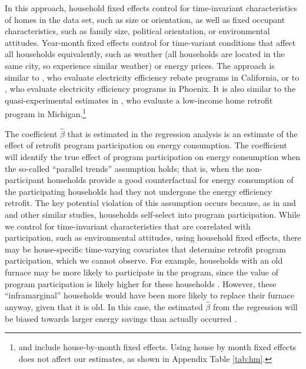 \documentclass{article}
\begin{document}
In this approach, household fixed effects control for time-invariant characteristics of homes in the data set, such as size or orientation, as well as fixed occupant characteristics, such as family size, political orientation, or environmental attitudes. Year-month fixed effects control for time-variant conditions that affect all households equivalently, such as weather (all households are located in the same city, so experience similar weather) or energy prices. The approach is similar to \cite{chuang2022residential}, who evaluate electricity efficiency rebate programs in California, or to \cite{liang2018energy}, who evaluate electricity efficiency programs in Phoenix. It is also similar to the quasi-experimental estimates in \cite{fowlie2018energy}, who evaluate a low-income home retrofit program in Michigan.\footnote{\cite{chuang2022residential} and \cite{fowlie2018energy} include house-by-month fixed effects. Using house by month fixed effects does not affect our estimates, as shown in Appendix Table \ref{tab:hm}.}

The coefficient $\hat{\beta}$ that is estimated in the regression analysis is an estimate of the effect of retrofit program participation on energy consumption. The coefficient will identify the true effect of program participation on energy consumption when the so-called ``parallel trends'' assumption holds; that is, when the non-participant households provide a good counterfactual for energy consumption of the participating households had they not undergone the energy efficiency retrofit. The key potential violation of this assumption occurs because, as in \cite{liang2018energy} and \cite{chuang2022residential} and other similar studies, households self-select into program participation. While we control for time-invariant characteristics that are correlated with participation, such as environmental attitudes, using household fixed effects, there may be house-specific time-varying covariates that determine retrofit program participation, which we cannot observe. For example, households with an old furnace may be more likely to participate in the program, since the value of program participation is likely higher for these households \citep{rivers2016free}. However, these ``inframarginal'' households would have been more likely to replace their furnace anyway, given that it is old. In this case, the estimated $\hat{\beta}$ from the regression will be biased towards larger energy savings than actually occurred \citep{boomhower2014credible}.
\end{document}
